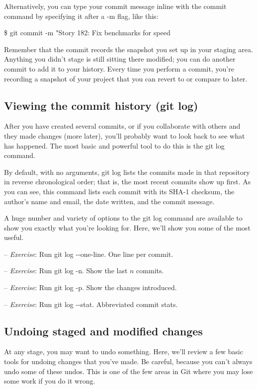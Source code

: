 \documentclass[12pt,a4]{article}
\newcommand{\ilcode}[1]{\textcolor[RGB]{160, 110, 220}{#1}}
\begin{document}
Alternatively, you can type your commit message inline with the commit command
by specifying it after a -m flag, like this:

\hspace*{1cm}
\ilcode{\$ git commit -m "Story 182: Fix benchmarks for speed}

Remember that the commit records the snapshot you set up in your staging area.
Anything you didn’t stage is still sitting there modified; you can do another
commit to add it to your history. Every time you perform a commit, you’re
recording a snapshot of your project that you can revert to or compare to later.

\subsection{Viewing the commit history (git log)}
After you have created several commits, or if you collaborate with others and
they made changes (more later), you’ll probably want to look back to see what
has happened. The most basic and powerful tool to do this is the \ilcode{git
log} command.

By default, with no arguments, \ilcode{git log} lists the commits made in that
repository in reverse chronological order; that is, the most recent commits show
up first. As you can see, this command lists each commit with its SHA-1
checksum, the author’s name and email, the date written, and the commit message.

A huge number and variety of options to the git log command are available to
show you exactly what you’re looking for. Here, we’ll show you some of the most
useful.

{\sf -- \emph{Exercise}:} Run \ilcode{git log -{}-one-line}. One line per commit.

{\sf -- \emph{Exercise}:} Run \ilcode{git log -n}. Show the last $n$ commits.

{\sf -- \emph{Exercise}:} Run \ilcode{git log -p}. Show the changes introduced.

{\sf -- \emph{Exercise}:} Run \ilcode{git log -{}-stat}. Abbreviated commit stats.

\subsection{Undoing staged and modified changes}
At any stage, you may want to undo something. Here, we’ll review a few basic
tools for undoing changes that you’ve made. Be careful, because you can’t always
undo some of these undos. This is one of the few areas in Git where you may lose
some work if you do it wrong.
\end{document}
